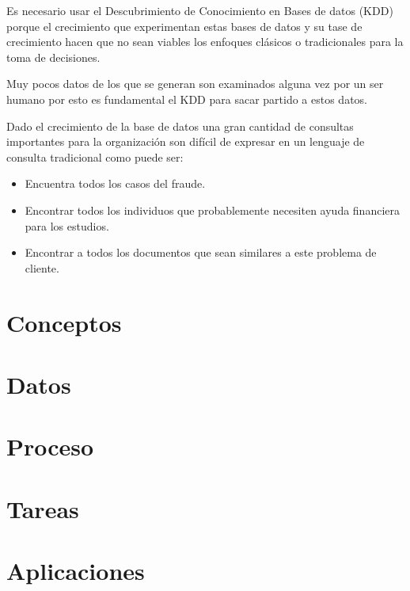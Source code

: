 \documentclass[12pt, twoside, openright]{report} %
\begin{document}
Es necesario usar el Descubrimiento de Conocimiento en Bases de datos (KDD) porque el crecimiento que experimentan estas bases de datos y su tase de crecimiento hacen que no sean viables los enfoques clásicos o tradicionales para la toma de decisiones.

Muy pocos datos de los que se generan son examinados alguna vez por un ser humano por esto es fundamental el KDD para sacar partido a estos datos.

Dado el crecimiento de la base de datos una gran cantidad de consultas importantes para la organización son difícil de expresar en un lenguaje de consulta tradicional como puede ser:
\begin{itemize}
	\item Encuentra todos los casos del fraude.
	\item Encontrar todos los individuos que probablemente necesiten ayuda financiera para los estudios.
	\item Encontrar a todos los documentos que sean similares a este problema de cliente.
\end{itemize}

\section{Conceptos}
\section{Datos}
\section{Proceso}
\section{Tareas}
\section{Aplicaciones}
\end{document}
